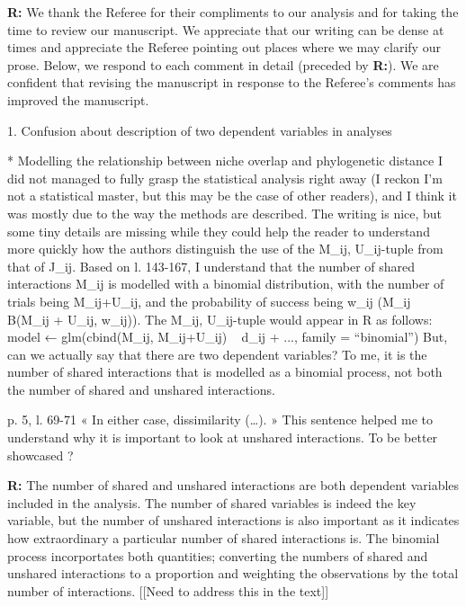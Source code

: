 \documentclass[12pt]{letter}
\newenvironment{refquote}{\bigskip \begin{it}}{\end{it}\smallskip}
\begin{document}
	\textbf{R:} We thank the Referee for their compliments to our analysis and for taking the time to review our manuscript. We appreciate that our writing can be dense at times and appreciate the Referee pointing out places where we may clarify our prose. Below, we respond to each comment in detail (preceded by \textbf{R:}). We are confident that revising the manuscript in response to the Referee's comments has improved the manuscript.


1. Confusion about description of two dependent variables in analyses

	\begin{refquote}
		* Modelling the relationship between niche overlap and phylogenetic distance
		I did not managed to fully grasp the statistical analysis right away (I reckon I'm not a statistical master, but this may be the case of other readers), and I think it was mostly due to the way the methods are described. The writing is nice, but some tiny details are missing while they could help the reader to understand more quickly how the authors distinguish the use of the {M_ij, U_ij}-tuple from that of J_ij.
		Based on l. 143-167, I understand that the number of shared interactions M_ij is modelled with a binomial distribution, with the number of trials being M_ij+U_ij, and the probability of success being w_ij (M_ij ~ B(M_ij + U_ij, w_ij)). The {M_ij, U_ij}-tuple would appear in R as follows:
		model ← glm(cbind(M_ij, M_ij+U_ij) ~ d_ij + ..., family = “binomial”)
		But, can we actually say that there are two dependent variables? To me, it is the number of shared interactions that is modelled as a binomial process, not both the number of shared and unshared interactions.

		\smallskip

		p. 5, l. 69-71 « In either case, dissimilarity (…). » This sentence helped me to understand why it is important to look at unshared interactions. To be better showcased ?

	\end{refquote}


	\textbf{R:} The number of shared and unshared interactions are both dependent variables included in the analysis. The number of shared variables is indeed the key variable, but the number of unshared interactions is also important as it indicates how extraordinary a particular number of shared interactions is. The binomial process incorportates both quantities; converting the numbers of shared and unshared interactions to a proportion and weighting the observations by the total number of interactions. [[Need to address this in the text]]
\end{document}
